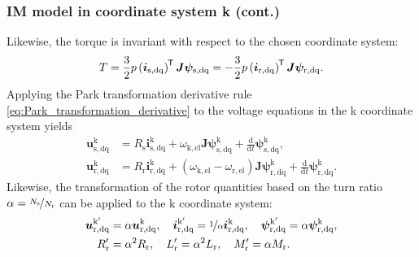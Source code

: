 \begin{frame}
	\frametitle{IM model in coordinate system k (cont.)}
    Likewise, the torque is invariant with respect to the chosen coordinate system:
    \begin{equation}
        T = \frac{3}{2} p \left(\bm{i}_\mathrm{s,dq}\right)^{\mkern-1.5mu\mathsf{T}}\bm{J}\bm{\psi}_\mathrm{s,dq} = -\frac{3}{2} p \left(\bm{i}_\mathrm{r,dq}\right)^{\mkern-1.5mu\mathsf{T}}\bm{J}\bm{\psi}_\mathrm{r,dq}.
    \end{equation}
    Applying the Park transformation derivative rule \eqref{eq:Park_transformation_derivative} to the voltage equations in the k coordinate system yields
    \begin{equation}
        \begin{alignedat}{2}
            \bm{u}^\mathrm{k}_\mathrm{s,dq} &= R_\mathrm{s} \bm{i}^\mathrm{k}_\mathrm{s,dq} + \omega_\mathrm{k,el}\bm{J} \bm{\psi}^\mathrm{k}_\mathrm{s,dq} + \frac{\mathrm{d}}{\mathrm{d}t}\bm{\psi}^\mathrm{k}_\mathrm{s,dq},\\
            \bm{u}^\mathrm{k}_\mathrm{r,dq} &= R_\mathrm{r} \bm{i}^\mathrm{k}_\mathrm{r,dq} +\left(\omega_\mathrm{k,el}-\omega_\mathrm{r,el}\right)\bm{J}\bm{\psi}^\mathrm{k}_\mathrm{r,dq} + \frac{\mathrm{d}}{\mathrm{d}t}\bm{\psi}^\mathrm{k}_\mathrm{r,dq}.
        \end{alignedat}
        \label{eq:IM_model_k_voltage_equations}
    \end{equation}
    Likewise, the transformation of the rotor quantities based on the turn ratio $\alpha = \nicefrac{N_\mathrm{s}}{N_\mathrm{r}}$ can be applied to the k coordinate system:
    \begin{equation}
        \begin{alignedat}{2}
            \bm{u}^{\mathrm{k}'}_\mathrm{r,dq} &= \alpha\bm{u}^\mathrm{k}_\mathrm{r,dq}, \quad \bm{i}^{\mathrm{k}'}_\mathrm{r,dq} = \nicefrac{1}{\alpha}\bm{i}^\mathrm{k}_\mathrm{r,dq}, \quad \bm{\psi}^{\mathrm{k}'}_\mathrm{r,dq} = \alpha\bm{\psi}^\mathrm{k}_\mathrm{r,dq},\\
            R'_\mathrm{r} &=  \alpha^2 R_\mathrm{r}, \quad L'_\mathrm{r} =  \alpha^2 L_\mathrm{r}, \quad M'_\mathrm{r} =  \alpha M_\mathrm{r}.
        \end{alignedat}
        \label{eq:IM_model_k_rotor_quantities_transformed}
    \end{equation}
\end{frame}

